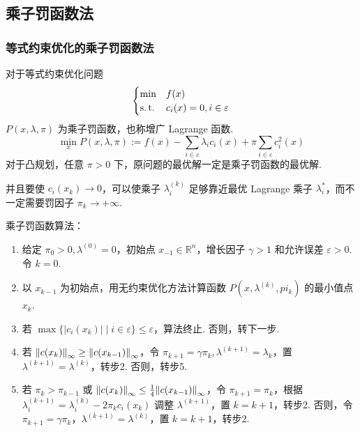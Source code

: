 \subsection{乘子罚函数法}
\subsubsection{等式约束优化的乘子罚函数法}
\begin{remark}
    对于等式约束优化问题\[\begin{cases}
        \min &f(x)\\
        \operatorname{s.t.} &c_i(x) = 0, i \in \varepsilon    
    \end{cases}\]
    $P(x, \lambda, \pi)$ 为乘子罚函数，也称增广 Lagrange 函数.
    \[\min_xP(x, \lambda, \pi) := f(x) - \sum_{i \in \varepsilon}\lambda_ic_i(x) + \pi\sum_{i \in \varepsilon}c_i^2(x)\]
    对于凸规划，任意 $\pi > 0$ 下，原问题的最优解一定是乘子罚函数的最优解.

    并且要使 $c_i(x_k) \to 0$，可以使乘子 $\lambda_i^{(k)}$ 足够靠近最优 Lagrange 乘子 $\lambda_i^*$，而不一定需要罚因子 $\pi_k \to +\infty$.
\end{remark}

\begin{remark}
    乘子罚函数算法：\begin{enumerate}
        \item 给定 $\pi_0 > 0, \lambda^{(0)} = 0$，初始点 $x_{-1} \in \mathbb{R}^n$，增长因子 $\gamma > 1$ 和允许误差 $\varepsilon > 0$. 令 $k = 0$.
        \item 以 $x_{k - 1}$ 为初始点，用无约束优化方法计算函数 $P(x, \lambda^{(k)}, pi_k)$ 的最小值点 $x_k$.
        \item 若 $\max\{|c_i(x_k)| \mid i \in \varepsilon\} \le \varepsilon$，算法终止. 否则，转下一步.
        \item 若 $\norm{c(x_k)}_\infty \ge \norm{c(x_{k - 1})}_\infty$，令 $\pi_{k + 1} = \gamma \pi_k, \lambda^{(k + 1)} = \lambda_k$，置 $\lambda^{(k + 1)} = \lambda^{(k)}$，转步2. 否则，转步5.
        \item 若 $\pi_k > \pi_{k - 1}$ 或 $\norm{c(x_k)}_\infty \le \frac{1}{4}\norm{c(x_{k - 1})}_\infty$，令 $\pi_{k + 1} = \pi_k$，根据 $\lambda_i^{(k + 1)} = \lambda_i^{(k)} - 2\pi_kc_i(x_k)$ 调整 $\lambda^{(k + 1)}$，置 $k = k + 1$，转步2. 否则，令 $\pi_{k + 1} = \gamma \pi_k$，$\lambda^{(k + 1)} = \lambda^{(k)}$，置 $k = k + 1$，转步2.
    \end{enumerate}
\end{remark}

